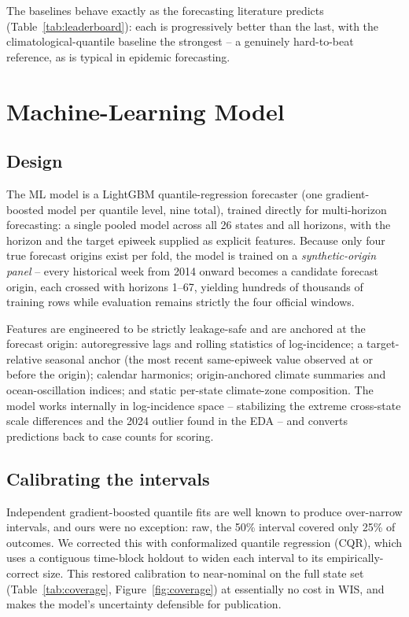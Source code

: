 \documentclass[11pt]{report}
\begin{document}
The baselines behave exactly as the forecasting literature predicts (Table~\ref{tab:leaderboard}): each is progressively better than the last, with the climatological-quantile baseline the strongest -- a genuinely hard-to-beat reference, as is typical in epidemic forecasting.

\chapter{Machine-Learning Model}

\section{Design}
The ML model is a LightGBM quantile-regression forecaster (one gradient-boosted model per quantile level, nine total), trained directly for multi-horizon forecasting: a single pooled model across all 26 states and all horizons, with the horizon and the target epiweek supplied as explicit features. Because only four true forecast origins exist per fold, the model is trained on a \emph{synthetic-origin panel} -- every historical week from 2014 onward becomes a candidate forecast origin, each crossed with horizons 1--67, yielding hundreds of thousands of training rows while evaluation remains strictly the four official windows.

Features are engineered to be strictly leakage-safe and are anchored at the forecast origin: autoregressive lags and rolling statistics of log-incidence; a target-relative seasonal anchor (the most recent same-epiweek value observed at or before the origin); calendar harmonics; origin-anchored climate summaries and ocean-oscillation indices; and static per-state climate-zone composition. The model works internally in log-incidence space -- stabilizing the extreme cross-state scale differences and the 2024 outlier found in the EDA -- and converts predictions back to case counts for scoring.

\section{Calibrating the intervals}
Independent gradient-boosted quantile fits are well known to produce over-narrow intervals, and ours were no exception: raw, the 50\% interval covered only 25\% of outcomes. We corrected this with conformalized quantile regression (CQR), which uses a contiguous time-block holdout to widen each interval to its empirically-correct size. This restored calibration to near-nominal on the full state set (Table~\ref{tab:coverage}, Figure~\ref{fig:coverage}) at essentially no cost in WIS, and makes the model's uncertainty defensible for publication.
\end{document}
